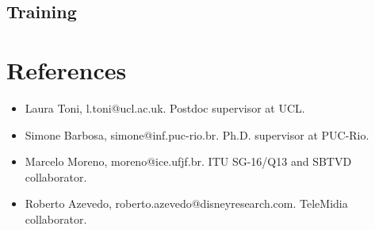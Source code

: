 \documentclass[10pt,a4paper,sans,colorlinks]{moderncv}
\begin{document}
\subsection{Training}

\section{References}

\begin{itemize}
  \item Laura Toni, l.toni@ucl.ac.uk. Postdoc supervisor at UCL.
  \item Simone Barbosa, simone@inf.puc-rio.br. Ph.D. supervisor at PUC-Rio.
  \item Marcelo Moreno, moreno@ice.ufjf.br. ITU SG-16/Q13 and SBTVD collaborator.
  \item Roberto Azevedo, roberto.azevedo@disneyresearch.com. TeleMidia collaborator.
\end{itemize}
\end{document}
